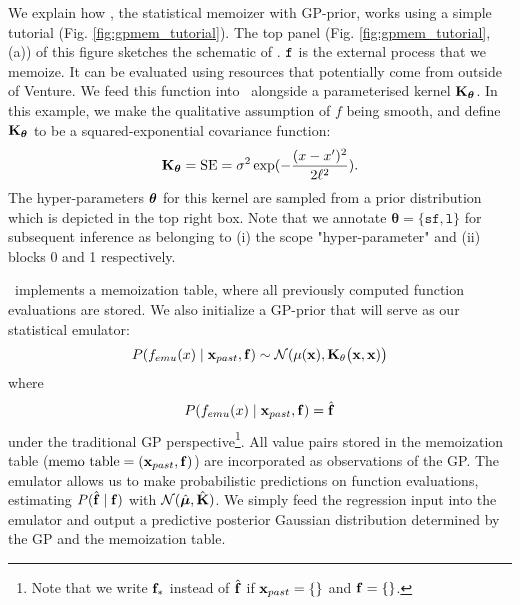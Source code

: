 We explain how \gpmem, the statistical memoizer with \ac{GP}-prior, works using a simple tutorial
(Fig. \ref{fig:gpmem_tutorial}). 
The top panel (Fig. \ref{fig:gpmem_tutorial}, (a)) of this figure sketches the schematic of \gpmem.
$\texttt{f}$ is the external process that we memoize. It can be evaluated using resources that potentially come
from outside of Venture.  
We feed this function into \gpmem\ alongside
a parameterised kernel $\mathbf{K}_{\bm{\theta}}$.  
In this example, we make the qualitative assumption of $f$ being smooth, and define
$\mathbf{K}_{\bm{\theta}}$ to be a squared-exponential covariance function:
\[
\mathbf{K}_{\bm{\theta}} = \text{SE} = \sigma^2 \exp(-\frac{(x-x^\prime)^2}{2\ell^2}).
\]
The hyper-parameters $\bm{\theta}$ for this kernel are sampled from a 
prior distribution which is depicted in the top right box.
Note that we annotate $\bm{\theta}=\{\texttt{sf},\texttt{l}\}$ for subsequent
inference as belonging to (i) the scope "hyper-parameter" and (ii) blocks 0 and 1 respectively.

\gpmem\ implements a memoization table, where all previously
computed function evaluations are stored. We also initialize a \ac{GP}-prior that
will serve as our statistical emulator:
\[
P(f_{emu}(x) \mid \mathbf{x}_{past},\mathbf{f})\sim \mathcal{N}(\mu(\mathbf{x}),\mathbf{K}_\theta\big(\mathbf{x},\mathbf{x})\big)
\]
where 
\[
P(f_{emu}(x) \mid \mathbf{x}_{past},\mathbf{f}) = \hat{\mathbf{f}} 
\]
under the traditional \ac{GP} perspective\footnote{Note that we write $\mathbf{f}_*$ instead of $\hat{\mathbf{f}}$ if $\mathbf{x}_{past}=\{\}$ and $\mathbf{f}=\{\}$.}.
All value pairs stored in the memoization table ($\text{memo table} = (\mathbf{x}_{past},\mathbf{f})$) are incorporated as observations of
the \ac{GP}.
The emulator allows us to make probabilistic predictions on function evaluations, estimating
$P(\hat{\mathbf{f}}\mid \mathbf{f})$ with $\mathcal{N}(\hat{\bm{\mu}},\hat{\mathbf{K}})$.
We simply feed the regression input
into the emulator and output a predictive posterior Gaussian distribution determined by the \ac{GP} and
the memoization table.

